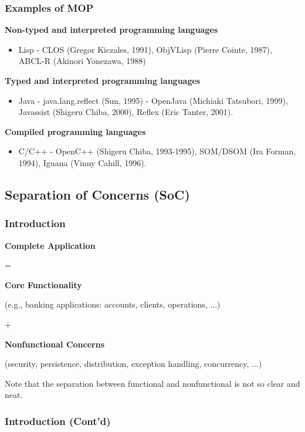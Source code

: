 \subsubsection{Examples of MOP}

\textbf{Non-typed and interpreted programming languages}
\begin{itemize}
	\item Lisp
		- CLOS (Gregor Kiczales, 1991), ObjVLisp (Pierre Cointe, 1987), ABCL-R (Akinori Yonezawa, 1988)
\end{itemize}

\textbf{Typed and interpreted programming languages}
\begin{itemize}
	\item Java
		- java.lang.reflect (Sun, 1995)
		- OpenJava (Michiaki Tatsubori, 1999), Javassist (Shigeru Chiba, 2000), Reflex (Eric Tanter, 2001).
\end{itemize}


\textbf{Compiled programming languages}
\begin{itemize}
	\item C/C++
		- OpenC++ (Shigeru Chiba, 1993-1995), SOM/DSOM (Ira Forman, 1994), Iguana (Vinny Cahill, 1996).
\end{itemize}

\subsection{Separation of Concerns (SoC)}

\subsubsection{Introduction}

\begin{center}
\textbf{Complete Application}

=

\textbf{Core Functionality}

(e.g., banking applications: accounts, clients, operations, ...)

+

\textbf{Nonfunctional Concerns}

(security, persistence, distribution, exception handling, concurrency, ...)
\end{center}

Note that the separation between functional and nonfunctional is not so clear and neat.

\subsubsection{Introduction (Cont'd)}

